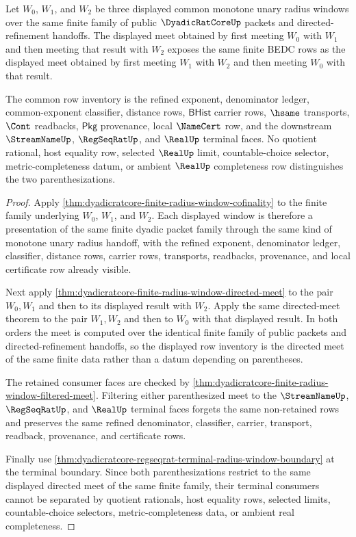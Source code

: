 \begin{theorem}
\label{thm:dyadicratcore-finite-radius-window-meet-associativity}
Let $W_0$, $W_1$, and $W_2$ be three displayed common monotone unary radius
windows over the same finite family of public $\DyadicRatCoreUp$ packets and
directed-refinement handoffs. The displayed meet obtained by first meeting
$W_0$ with $W_1$ and then meeting that result with $W_2$ exposes the same finite
BEDC rows as the displayed meet obtained by first meeting $W_1$ with $W_2$ and
then meeting $W_0$ with that result.

The common row inventory is the refined exponent, denominator ledger,
common-exponent classifier, distance rows, $\mathsf{BHist}$ carrier rows,
$\hsame$ transports, $\Cont$ readbacks, $\mathsf{Pkg}$ provenance, local
$\NameCert$ row, and the downstream $\StreamNameUp$, $\RegSeqRatUp$, and
$\RealUp$ terminal faces. No quotient rational, host equality row, selected
$\RealUp$ limit, countable-choice selector, metric-completeness datum, or
ambient $\RealUp$ completeness row distinguishes the two parenthesizations.
\end{theorem}
\begin{proof}
Apply \autoref{thm:dyadicratcore-finite-radius-window-cofinality} to the finite
family underlying $W_0$, $W_1$, and $W_2$. Each displayed window is therefore a
presentation of the same finite dyadic packet family through the same kind of
monotone unary radius handoff, with the refined exponent, denominator ledger,
classifier, distance rows, carrier rows, transports, readbacks, provenance, and
local certificate row already visible.

Next apply \autoref{thm:dyadicratcore-finite-radius-window-directed-meet} to
the pair $W_0,W_1$ and then to its displayed result with $W_2$. Apply the same
directed-meet theorem to the pair $W_1,W_2$ and then to $W_0$ with that
displayed result. In both orders the meet is computed over the identical finite
family of public packets and directed-refinement handoffs, so the displayed row
inventory is the directed meet of the same finite data rather than a datum
depending on parentheses.

The retained consumer faces are checked by
\autoref{thm:dyadicratcore-finite-radius-window-filtered-meet}. Filtering either
parenthesized meet to the $\StreamNameUp$, $\RegSeqRatUp$, and $\RealUp$
terminal faces forgets the same non-retained rows and preserves the same
refined denominator, classifier, carrier, transport, readback, provenance, and
certificate rows.

Finally use
\autoref{thm:dyadicratcore-regseqrat-terminal-radius-window-boundary} at the
terminal boundary. Since both parenthesizations restrict to the same displayed
directed meet of the same finite family, their terminal consumers cannot be
separated by quotient rationals, host equality rows, selected limits,
countable-choice selectors, metric-completeness data, or ambient real
completeness.
\end{proof}

